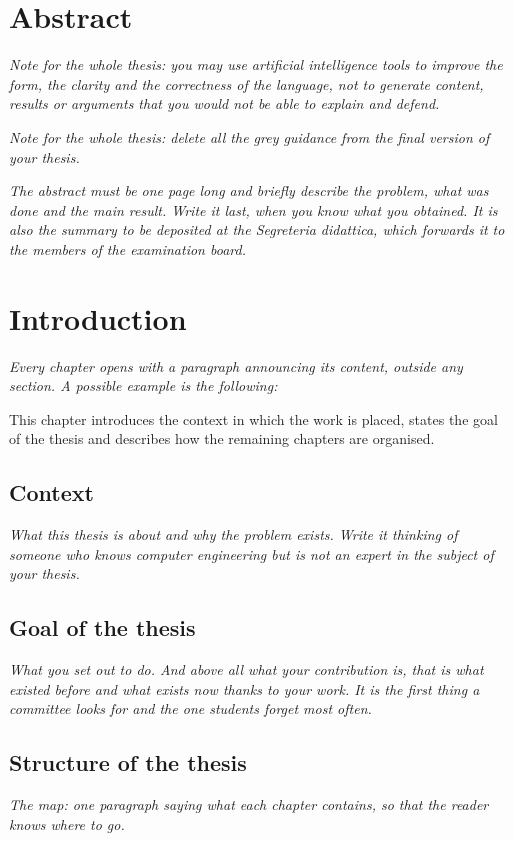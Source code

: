 \documentclass[12pt,a4paper,oneside]{report}
\newcommand{\guida}[1]{{\itshape\color{gray}#1\par}}
\newcommand{\esempio}[1]{#1\par}
\begin{document}


\tableofcontents
\listoffigures
\listoftables

\chapter*{Abstract}
\guida{Note for the whole thesis: you may use artificial intelligence tools to improve the form, the clarity and the correctness of the language, not to generate content, results or arguments that you would not be able to explain and defend.}
\guida{Note for the whole thesis: delete all the grey guidance from the final
version of your thesis.}
\guida{The abstract must be one page long and briefly describe the problem, what was done and the main result. Write it last, when you know what you obtained. It is also the summary to be deposited at the Segreteria didattica, which forwards it to the members of the examination board.}

\chapter{Introduction}
\guida{Every chapter opens with a paragraph announcing its content, outside
any section. A possible example is the following:}
\esempio{This chapter introduces the context in which the work is placed,
states the goal of the thesis and describes how the remaining chapters are
organised.}

\section{Context}
\guida{What this thesis is about and why the problem exists. Write it thinking of someone
who knows computer engineering but is not an expert in the subject of your
thesis.}

\section{Goal of the thesis}
\guida{What you set out to do. And above all what your contribution is, that
is what existed before and what exists now thanks to your work. It is the
first thing a committee looks for and the one students forget most often.}

\section{Structure of the thesis}
\guida{The map: one paragraph saying what each chapter contains, so that the
reader knows where to go.}
\end{document}
